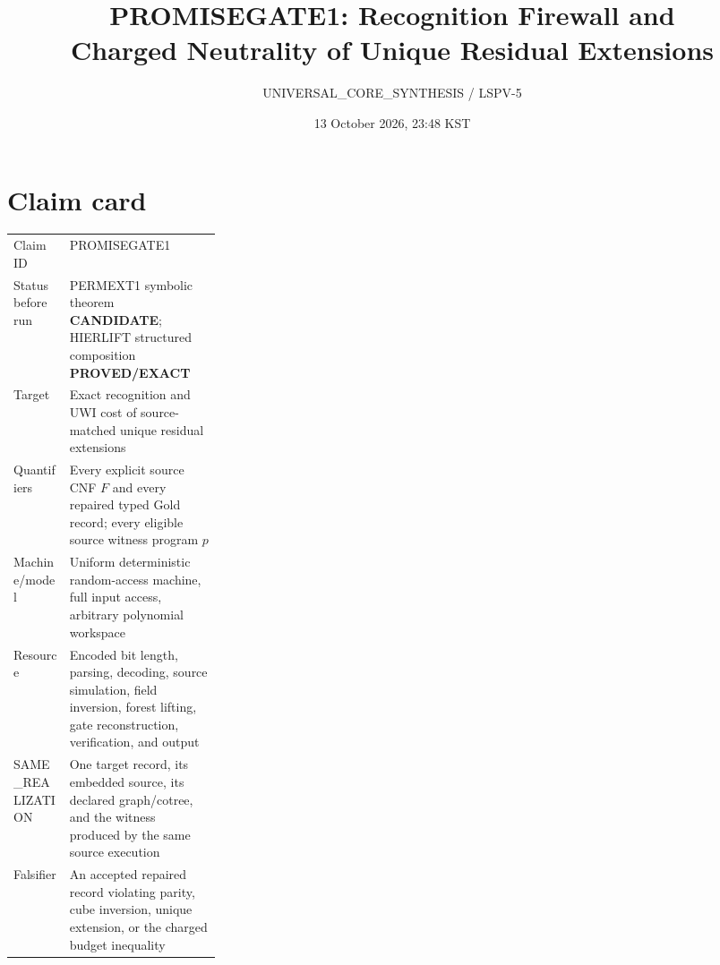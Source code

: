 \documentclass[11pt]{article}
\title{PROMISEGATE1: Recognition Firewall and\\Charged Neutrality of Unique Residual Extensions}
\author{UNIVERSAL\_CORE\_SYNTHESIS / LSPV-5}
\date{13 October 2026, 23:48 KST}
\newcommand{\EXACT}{\textbf{PROVED/EXACT}}
\newcommand{\CAND}{\textbf{CANDIDATE}}
\begin{document}
\maketitle

\begin{center}
\end{center}

\section{Claim card}
\begin{tabularx}{\linewidth}{p{0.27\linewidth}X}
\toprule
Claim ID & PROMISEGATE1 \\
Status before run & PERMEXT1 symbolic theorem \CAND; HIERLIFT structured composition \EXACT \\
Target & Exact recognition and UWI cost of source-matched unique residual extensions \\
Quantifiers & Every explicit source CNF $F$ and every repaired typed Gold record; every eligible source witness program $p$ \\
Machine/model & Uniform deterministic random-access machine, full input access, arbitrary polynomial workspace \\
Resource & Encoded bit length, parsing, decoding, source simulation, field inversion, forest lifting, gate reconstruction, verification, and output \\
SAME\_REALIZATION & One target record, its embedded source, its declared graph/cotree, and the witness produced by the same source execution \\
Falsifier & An accepted repaired record violating parity, cube inversion, unique extension, or the charged budget inequality \\
\bottomrule
\end{tabularx}
\end{document}
